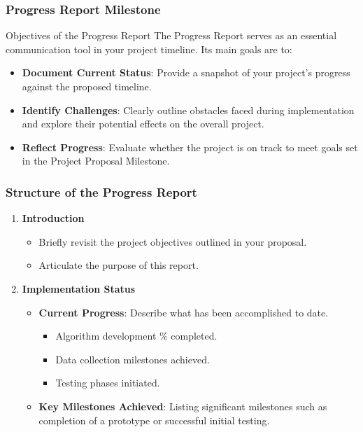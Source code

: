 \documentclass[aspectratio=169]{beamer}
\begin{document}
\begin{frame}[fragile]
    \frametitle{Progress Report Milestone}
    \begin{block}{Objectives of the Progress Report}
        The Progress Report serves as an essential communication tool in your project timeline. Its main goals are to:
    \end{block}
    \begin{itemize}
        \item \textbf{Document Current Status}: Provide a snapshot of your project's progress against the proposed timeline.
        \item \textbf{Identify Challenges}: Clearly outline obstacles faced during implementation and explore their potential effects on the overall project.
        \item \textbf{Reflect Progress}: Evaluate whether the project is on track to meet goals set in the Project Proposal Milestone.
    \end{itemize}
\end{frame}

\begin{frame}[fragile]
    \frametitle{Structure of the Progress Report}
    \begin{enumerate}
        \item \textbf{Introduction}  
            \begin{itemize}
                \item Briefly revisit the project objectives outlined in your proposal.
                \item Articulate the purpose of this report.
            \end{itemize}
        
        \item \textbf{Implementation Status}
            \begin{itemize}
                \item \textbf{Current Progress}: Describe what has been accomplished to date.
                    \begin{itemize}
                        \item Algorithm development \% completed.
                        \item Data collection milestones achieved.
                        \item Testing phases initiated.
                    \end{itemize}
                \item \textbf{Key Milestones Achieved}: Listing significant milestones such as completion of a prototype or successful initial testing.
            \end{itemize}
    \end{enumerate}
\end{frame}
\end{document}
